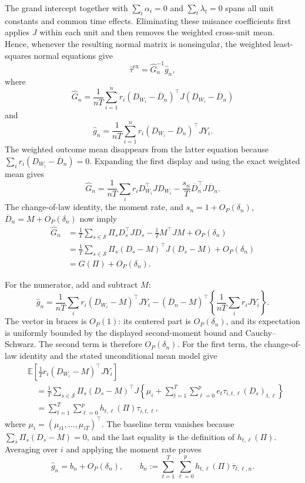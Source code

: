 The grand intercept together with \(\sum_i\alpha_i=0\) and \(\sum_t\lambda_t=0\) spans all unit constants and common time effects. Eliminating these nuisance coefficients first applies \(J\) within each unit and then removes the weighted cross-unit mean. Hence, whenever the resulting normal matrix is nonsingular, the weighted least-squares normal equations give
\[
\widehat\tau^{\mathrm{ex}}=\widehat G_n^{-1}\widehat g_n,
\]
where
\[
\widehat G_n=\frac{1}{nT}\sum_{i=1}^{n}r_i
(D_{W_i}-\overline D_n)^{\top}J(D_{W_i}-\overline D_n)
\]
and
\[
\widehat g_n=\frac{1}{nT}\sum_{i=1}^{n}r_i
(D_{W_i}-\overline D_n)^{\top}JY_i.
\]
The weighted outcome mean disappears from the latter equation because
\(\sum_i r_i(D_{W_i}-\overline D_n)=0\). Expanding the first display and using the exact weighted mean gives
\[
\widehat G_n
=\frac{1}{nT}\sum_i r_iD_{W_i}^{\top}JD_{W_i}
  -\frac{s_n}{T}\overline D_n^{\top}J\overline D_n.
\]
The change-of-law identity, the moment rate, and
\(s_n=1+O_P(\delta_n)\), \(\overline D_n=M+O_P(\delta_n)\) now imply
\[
\begin{aligned}
\widehat G_n
&=\frac1T\sum_{s\in\mathcal S}\Pi_sD_s^{\top}JD_s
  -\frac1T M^{\top}JM+O_P(\delta_n)\\
&=\frac1T\sum_{s\in\mathcal S}\Pi_s
  (D_s-M)^{\top}J(D_s-M)+O_P(\delta_n)\\
&=G(\Pi)+O_P(\delta_n).
\end{aligned}
\]

For the numerator, add and subtract \(M\):
\[
\widehat g_n
=\frac{1}{nT}\sum_i r_i(D_{W_i}-M)^{\top}JY_i
 -(\overline D_n-M)^{\top}
   \left\{\frac{1}{nT}\sum_i r_iJY_i\right\}.
\]
The vector in braces is \(O_P(1)\): its centered part is \(O_P(\delta_n)\), and its expectation is uniformly bounded by the displayed second-moment bound and Cauchy--Schwarz. The second term is therefore \(O_P(\delta_n)\). For the first term, the change-of-law identity and the stated unconditional mean model give
\[
\begin{aligned}
&\mathbb E\!\left[\frac1T r_i(D_{W_i}-M)^{\top}JY_i\right]\\
&\quad=\frac1T\sum_{s\in\mathcal S}\Pi_s(D_s-M)^{\top}J
\left\{\mu_i+\sum_{t=1}^{T}\sum_{\ell=0}^{p}
e_t\tau_{i,t,\ell}(D_s)_{t,\ell}\right\}\\
&\quad=\sum_{t=1}^{T}\sum_{\ell=0}^{p}
h_{t,\ell}(\Pi)\tau_{i,t,\ell},
\end{aligned}
\]
where \(\mu_i=(\mu_{i1},\ldots,\mu_{iT})^{\top}\). The baseline term vanishes because
\(\sum_s\Pi_s(D_s-M)=0\), and the last equality is the definition of \(h_{t,\ell}(\Pi)\). Averaging over \(i\) and applying the moment rate proves
\[
\widehat g_n=b_n+O_P(\delta_n),
\qquad
b_n:=\sum_{t=1}^{T}\sum_{\ell=0}^{p}
h_{t,\ell}(\Pi)\overline\tau_{t,\ell,n}.
\]

